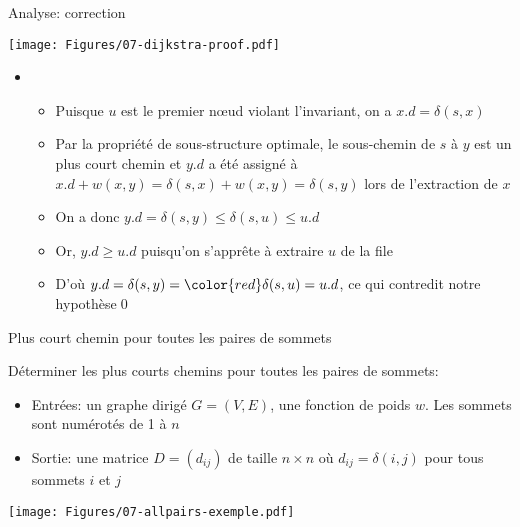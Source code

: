 \begin{frame}{Analyse: correction}

\centerline{\texttt{[image: Figures/07-dijkstra-proof.pdf]}}

\begin{itemize}
\item[]
\begin{itemize}
\item Puisque $u$ est le premier n\oe ud violant l'invariant, on a $x.d=\delta(s,x)$
\item Par la propriété de sous-structure optimale, le sous-chemin de $s$ à $y$ est un plus court chemin et $y.d$ a été assigné à $x.d+w(x,y)=\delta(s,x)+w(x,y)=\delta(s,y)$ lors de l'extraction de $x$
\item On a donc $y.d=\delta(s,y)\leq \delta(s,u)\leq u.d$
\item Or, $y.d\geq u.d$ puisqu'on s'apprête à extraire $u$ de la file
\item D'où $y.d=\delta(s,y)={\color{red}\delta(s,u)=u.d}$, ce qui contredit notre hypothèse\qed
\end{itemize}
\end{itemize}

\end{frame}


\begin{frame}{Plus court chemin pour toutes les paires de sommets}

Déterminer les plus courts chemins pour toutes les paires de sommets:
\begin{itemize}
\item Entrées: un graphe dirigé $G=(V,E)$, une fonction de poids $w$. Les sommets sont numérotés de 1 à $n$
\item Sortie: une matrice $D=(d_{ij})$ de taille $n\times n$ où $d_{ij}=\delta(i,j)$ pour tous sommets $i$ et $j$
\end{itemize}

\bigskip

\centerline{\texttt{[image: Figures/07-allpairs-exemple.pdf]}}

\end{frame}

